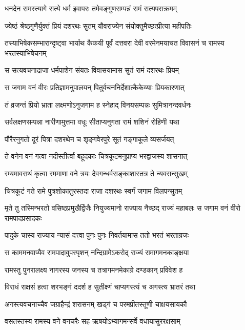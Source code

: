 \twolineshloka
{धनदेन समस्त्यागे सत्ये धर्म इवापरः}
{तमेवङ्गुणसम्पन्नं रामं सत्यपराक्रमम्} %

\twolineshloka
{ज्येष्ठं श्रेष्ठगुणैर्युक्तं प्रियं दशरथः सुतम्}
{यौवराज्येन संयोक्तुमैच्छत्प्रीत्या महीपतिः} %

\threelineshloka
{तस्याभिषेकसम्भारान्दृष्ट्वा भार्याथ कैकयी}
{पूर्वं दत्तवरा देवी वरमेनमयाचत}
{विवासनं च रामस्य भरतस्याभिषेचनम्} %

\twolineshloka
{स सत्यवचनाद्राजा धर्मपाशेन संयतः}
{विवासयामास सुतं रामं दशरथः प्रियम्} %

\twolineshloka
{स जगाम वनं वीरः प्रतिज्ञामनुपालयन्}
{पितुर्वचननिर्देशात्कैकेय्याः प्रियकारणात्} %

\twolineshloka
{तं व्रजन्तं प्रियो भ्राता लक्ष्मणोऽनुजगाम ह}
{स्नेहाद् विनयसम्पन्नः सुमित्रानन्दवर्धनः} %

\twolineshloka
{सर्वलक्षणसम्पन्ना नारीणामुत्तमा वधूः}
{सीताप्यनुगता रामं शशिनं रोहिणी यथा} %

\twolineshloka
{पौरैरनुगतो दूरं पित्रा दशरथेन च}
{शृङ्गवेरपुरे सूतं गङ्गाकूले व्यसर्जयत्} %

\twolineshloka
{ते वनेन वनं गत्वा नदीस्तीर्त्वा बहूदकाः}
{चित्रकूटमनुप्राप्य भरद्वाजस्य शासनात्} %

\twolineshloka
{रम्यमावसथं कृत्वा रममाणा वने त्रयः}
{देवगन्धर्वसङ्काशास्तत्र ते न्यवसन्सुखम्} %

\twolineshloka
{चित्रकूटं गते रामे पुत्रशोकातुरस्तदा}
{राजा दशरथः स्वर्गं जगाम विलपन्सुतम्} %

\threelineshloka
{मृते तु तस्मिन्भरतो वसिष्ठप्रमुखैर्द्विजैः}
{नियुज्यमानो राज्याय नैच्छद् राज्यं महाबलः}
{स जगाम वनं वीरो रामपादप्रसादकः} %

\twolineshloka
{पादुके चास्य राज्याय न्यासं दत्त्वा पुनः पुनः}
{निवर्तयामास ततो भरतं भरताग्रजः} %

\twolineshloka
{स काममनवाप्यैव रामपादावुपस्पृशन्}
{नन्दिग्रामेऽकरोद् राज्यं रामागमनकाङ्क्षया} %

\twolineshloka
{रामस्तु पुनरालक्ष्य नागरस्य जनस्य च}
{तत्रागमनमेकाग्रे दण्डकान् प्रविवेश ह} %

\twolineshloka
{विराधं राक्षसं हत्वा शरभङ्गं ददर्श ह}
{सुतीक्ष्णं चाप्यगस्त्यं च अगस्त्य भ्रातरं तथा} %

\twolineshloka
{अगस्त्यवचनाच्चैव जग्राहैन्द्रं शरासनम्}
{खड्गं च परमप्रीतस्तूणी चाक्षयसायकौ} %

\twolineshloka
{वसतस्तस्य रामस्य वने वनचरैः सह}
{ऋषयोऽभ्यागमन्सर्वे वधायासुररक्षसाम्} %

